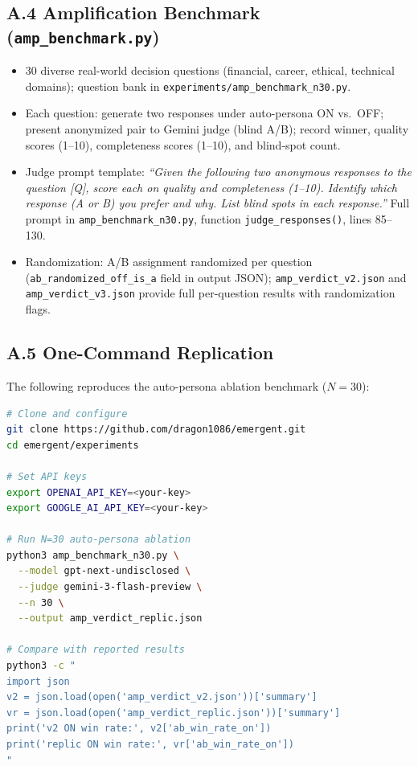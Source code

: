 \documentclass[12pt]{article}
\begin{document}
\subsection*{A.4 Amplification Benchmark (\texttt{amp\_benchmark.py})}

\begin{itemize}
  \item 30 diverse real-world decision questions (financial, career, ethical,
        technical domains); question bank in \texttt{experiments/amp\_benchmark\_n30.py}.
  \item Each question: generate two responses under auto-persona ON vs.\ OFF;
        present anonymized pair to Gemini judge (blind A/B); record winner,
        quality scores (1--10), completeness scores (1--10), and blind-spot count.
  \item Judge prompt template: \emph{``Given the following two anonymous responses
        to the question [Q], score each on quality and completeness (1--10).
        Identify which response (A or B) you prefer and why. List blind spots
        in each response.''} Full prompt in \texttt{amp\_benchmark\_n30.py},
        function \texttt{judge\_responses()}, lines 85--130.
  \item Randomization: A/B assignment randomized per question
        (\texttt{ab\_randomized\_off\_is\_a} field in output JSON);
        \texttt{amp\_verdict\_v2.json} and \texttt{amp\_verdict\_v3.json} provide
        full per-question results with randomization flags.
\end{itemize}

\subsection*{A.5 One-Command Replication}

The following reproduces the auto-persona ablation benchmark ($N=30$):

\begin{lstlisting}[language=bash,caption={Replication command for amp\_verdict benchmark}]
# Clone and configure
git clone https://github.com/dragon1086/emergent.git
cd emergent/experiments

# Set API keys
export OPENAI_API_KEY=<your-key>
export GOOGLE_AI_API_KEY=<your-key>

# Run N=30 auto-persona ablation
python3 amp_benchmark_n30.py \
  --model gpt-next-undisclosed \
  --judge gemini-3-flash-preview \
  --n 30 \
  --output amp_verdict_replic.json

# Compare with reported results
python3 -c "
import json
v2 = json.load(open('amp_verdict_v2.json'))['summary']
vr = json.load(open('amp_verdict_replic.json'))['summary']
print('v2 ON win rate:', v2['ab_win_rate_on'])
print('replic ON win rate:', vr['ab_win_rate_on'])
"
\end{lstlisting}
\end{document}
